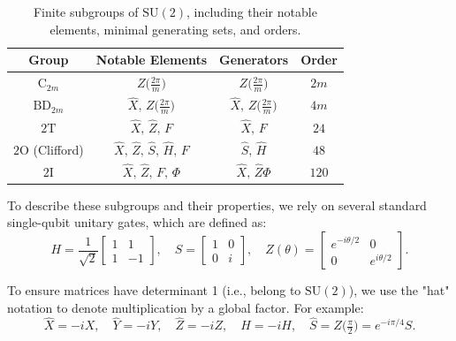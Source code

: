 \documentclass[8pt]{article}
\theoremstyle{definition}
\begin{document}
\begin{table}[h!]
    \centering
    \begin{tabular}{c | c c c}
        \toprule
        Group                    & Notable Elements                            & Generators                               & Order \\
        \midrule
        $\mathrm{C}_{2m}$        & $Z\bigl(\tfrac{2\pi}{m}\bigr)$              & $Z\bigl(\tfrac{2\pi}{m}\bigr)$           & $2m$  \\
        $\mathrm{BD}_{2m}$       & $\hat{X},\,Z\bigl(\tfrac{2\pi}{m}\bigr)$    & $\hat{X},\,Z\bigl(\tfrac{2\pi}{m}\bigr)$ & $4m$  \\
        $2\mathrm{T}$            & $\hat{X},\,\hat{Z},\,F$                     & $\hat{X},\,F$                            & $24$  \\
        $2\mathrm{O}$ (Clifford) & $\hat{X},\,\hat{Z},\,\hat{S},\,\hat{H},\,F$ & $\hat{S},\,\hat{H}$                      & $48$  \\
        $2\mathrm{I}$            & $\hat{X},\,\hat{Z},\,F,\,\Phi$              & $\hat{X},\,\hat{Z}\Phi$                  & $120$ \\
        \bottomrule
    \end{tabular}
    \caption{Finite subgroups of \(\mathrm{SU}(2)\), including their notable elements, minimal generating sets, and orders.}
    \label{table:su2-subgroup}
\end{table}

To describe these subgroups and their properties, we rely on several standard single-qubit unitary gates, which are defined as:
\[
    H = \frac{1}{\sqrt{2}}
    \begin{bmatrix}
        1 & 1  \\
        1 & -1
    \end{bmatrix}, \quad
    S =
    \begin{bmatrix}
        1 & 0 \\
        0 & i
    \end{bmatrix}, \quad
    Z(\theta) =
    \begin{bmatrix}
        e^{-i\theta/2} & 0             \\
        0              & e^{i\theta/2}
    \end{bmatrix}.
\]


To ensure matrices have determinant 1 (i.e., belong to \(\mathrm{SU}(2)\)), we use the "hat" notation to denote multiplication by a global factor. For example:
\[
    \hat{X} = -iX, \quad \hat{Y} = -iY, \quad \hat{Z} = -iZ, \quad \hat{H} = -iH, \quad \hat{S} = Z\bigl(\tfrac{\pi}{2}\bigr) = e^{-i\pi/4}S.
\]
\end{document}
